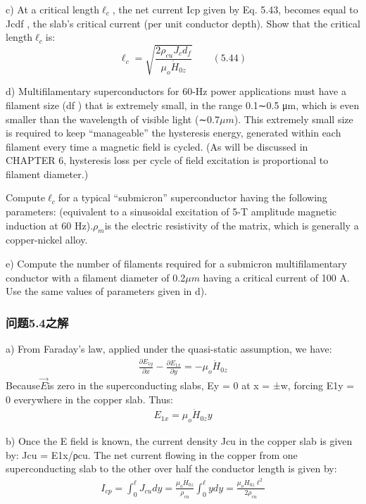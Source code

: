 c) At a critical length$\ell_c$, the net current Icp given by Eq. 5.43, becomes equal
to Jcdf , the slab’s critical current (per unit conductor depth). Show that
the critical length$\ell_c$is:
\begin{equation}%
\ell_{c}=\sqrt{\frac{2\rho_{cu}J_{c}d_{f}}{\mu_{o}\dot{H}_{0z}}}\qquad(5.44)
\end{equation}

d) Multifilamentary superconductors for 60-Hz power applications must have a
filament size (df ) that is extremely small, in the range 0.1∼0.5 μm, which
is even smaller than the wavelength of visible light (∼0.7$\mu m$). This extremely
small size is required to keep “manageable” the hysteresis energy,
generated within each filament every time a magnetic field is cycled. (As
will be discussed in CHAPTER 6, hysteresis loss per cycle of field excitation
is proportional to filament diameter.)

Compute$\ell_c$for a typical “submicron” superconductor having the following
parameters:
(equivalent to a sinusoidal excitation of 5-T amplitude magnetic induction
at 60 Hz).$\rho_m$is the electric resistivity of the matrix, which is generally a
copper-nickel alloy.

e) Compute the number of filaments required for a submicron multifilamentary
conductor with a filament diameter of 0.2$\mu m$ having a critical current of
100 A. Use the same values of parameters given in d).

\subsubsection{问题5.4之解}
a) From Faraday’s law, applied under the quasi-static assumption, we have:
\begin{align*}%
\frac{\partial E_{1y}}{\partial x}-\frac{\partial E_{1x}}{\partial y}=-\mu_{o}\dot{H}_{0z}\tag{S4.1}
\end{align*}
Because$\vec{E}$is zero in the superconducting slabs, Ey = 0 at x = ±w, forcing E1y = 0
everywhere in the copper slab. Thus:
\begin{align*}%
E_{1x}=\mu_{o}\dot{H}_{0z}y\tag{5.42}
\end{align*}

b) Once the E field is known, the current density Jcu in the copper slab is given
by: Jcu = E1x/ρcu. The net current flowing in the copper from one superconducting
slab to the other over half the conductor length is given by:
\begin{align*}%
I_{cp}=\int_{0}^{\ell}J_{cu}dy=\frac{\mu_{o}\dot{H}_{0z}}{\rho_{cu}}\int_{0}^{\ell}ydy=\frac{\mu_{o}\dot{H}_{0z}\ell^{2}}{2\rho_{cu}}\tag{5.43}
\end{align*}

